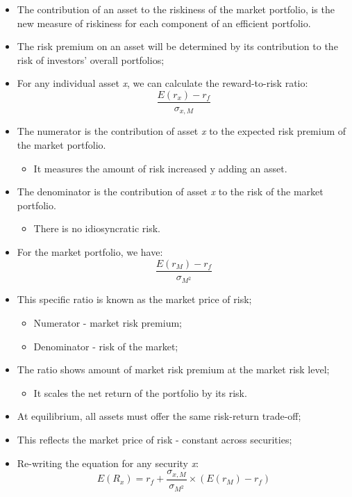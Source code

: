 \documentclass[11pt,a4paper]{report}
\begin{document}
\begin{itemize}
\begin{itemize}
    \end{itemize}
    \item The contribution of an asset to the riskiness of the market portfolio, is the new measure of riskiness for each component of an efficient portfolio.
    \item The risk premium on an asset will be determined by its contribution to the risk of investors' overall portfolios;
    \item For any individual asset \textit{x}, we can calculate the reward-to-risk ratio:
    \[\frac{E(r_x)-r_f}{\sigma_{x,M}}\]
    \item The numerator is the contribution of asset \textit{x} to the expected risk premium of the market portfolio.
    \begin{itemize}
        \item It measures the amount of risk increased y adding an asset.
    \end{itemize}
    \item The denominator is the contribution of asset \textit{x} to the risk of the market portfolio.
    \begin{itemize}
        \item There is no idiosyncratic risk.
    \end{itemize}
    \item For the market portfolio, we have:
    \[\frac{E(r_M)-r_f}{\sigma_{M^2}}\]
    \item This specific ratio is known as the market price of risk;
    \begin{itemize}
        \item Numerator - market risk premium;
        \item Denominator - risk of the market;
    \end{itemize}
    \item The ratio shows amount of market risk premium at the market risk level;
    \begin{itemize}
        \item It scales the net return of the portfolio by its risk.
    \end{itemize}
    \item At equilibrium, all assets must offer the same risk-return trade-off;
    \item This reflects the market price of risk - constant across securities;
    \item Re-writing the equation for any security \textit{x}:
    \[E(R_x) = r_f + \frac{\sigma_{x,M}}{\sigma_{M^2}}\times(E(r_M)- r_f)\]

\end{itemize}
\end{document}
